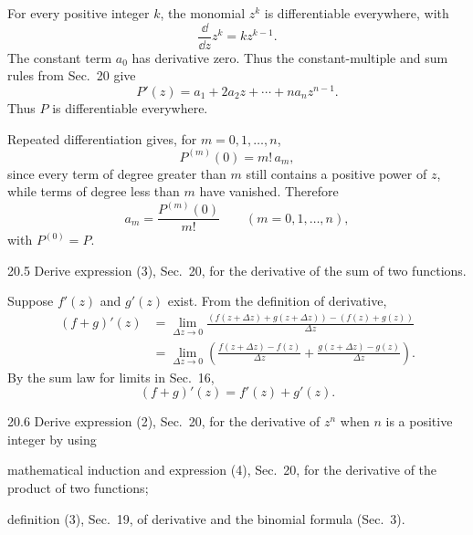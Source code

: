 \documentclass[11pt,oneside]{article}
\begin{document}
\begin{solution}
\begin{exercisesubparts}
    \item For every positive integer \(k\), the monomial \(z^k\) is differentiable everywhere, with
    \[
        \frac{\dd}{\dd z}z^k=kz^{k-1}.
    \]
    The constant term \(a_0\) has derivative zero. Thus the constant-multiple and sum rules from Sec.~20 give
    \[
        \boxed{P'(z)=a_1+2a_2z+\cdots+na_nz^{n-1}}.
    \]
    Thus \(P\) is differentiable everywhere.

    \item Repeated differentiation gives, for \(m=0, 1, \ldots, n\),
    \[
        P^{(m)}(0)=m!\,a_m,
    \]
    since every term of degree greater than \(m\) still contains a positive power of \(z\), while terms of degree less than \(m\) have vanished. Therefore
    \[
        \boxed{a_m=\frac{P^{(m)}(0)}{m!}}
        \qquad(m=0, 1, \ldots, n),
    \]
    with \(P^{(0)}=P\).
\end{exercisesubparts}
\end{solution}

\begin{exercise}{20.5}
Derive expression (3), Sec.~20, for the derivative of the sum of two functions.
\end{exercise}

\begin{solution}
Suppose \(f'(z)\) and \(g'(z)\) exist. From the definition of derivative,
\[
\begin{aligned}
    (f+g)'(z)
    &=\lim_{\Delta z\to0}
      \frac{(f(z+\Delta z)+g(z+\Delta z))-(f(z)+g(z))}{\Delta z}\\
    &=\lim_{\Delta z\to0}
      \left(
      \frac{f(z+\Delta z)-f(z)}{\Delta z}
      +
      \frac{g(z+\Delta z)-g(z)}{\Delta z}
      \right).
\end{aligned}
\]
By the sum law for limits in Sec.~16,
\[
    \boxed{(f+g)'(z)=f'(z)+g'(z)}.
\]
\end{solution}

\begin{exercise}{20.6}
Derive expression (2), Sec.~20, for the derivative of \(z^n\) when \(n\) is a positive integer by using
\begin{exercisesubparts}
    \item mathematical induction and expression (4), Sec.~20, for the derivative of the product of two functions;
    \item definition (3), Sec.~19, of derivative and the binomial formula (Sec.~3).
\end{exercisesubparts}
\end{exercise}
\end{document}
